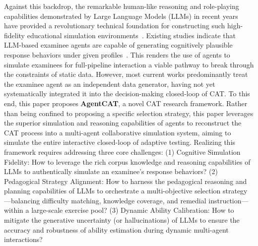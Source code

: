 Against this backdrop, the remarkable human-like reasoning and role-playing capabilities demonstrated by Large Language Models (LLMs) in recent years have provided a revolutionary technical foundation for constructing such high-fidelity educational simulation environments~\cite{11410595,naveed2025comprehensive,lang10669809}. Existing studies indicate that LLM-based examinee agents are capable of generating cognitively plausible response behaviors under given profiles~\cite{gao2025agent4edu}. This renders the use of agents to simulate examinees for full-pipeline interaction a viable pathway to break through the constraints of static data. However, most current works predominantly treat the examinee agent as an independent data generator, having not yet systematically integrated it into the decision-making closed-loop of CAT. To this end, this paper proposes \textbf{AgentCAT}, a novel CAT research framework. Rather than being confined to proposing a specific selection strategy, this paper leverages the superior simulation and reasoning capabilities of agents to reconstruct the CAT process into a multi-agent collaborative simulation system, aiming to simulate the entire interactive closed-loop of adaptive testing. Realizing this framework requires addressing three core challenges: (1) Cognitive Simulation Fidelity: How to leverage the rich corpus knowledge and reasoning capabilities of LLMs to authentically simulate an examinee's response behaviors?
(2) Pedagogical Strategy Alignment: How to harness the pedagogical reasoning and planning capabilities of LLMs to orchestrate a multi-objective selection strategy—balancing difficulty matching, knowledge coverage, and remedial instruction—within a large-scale exercise pool?
(3) Dynamic Ability Calibration: How to mitigate the generative uncertainty (or hallucinations) of LLMs to ensure the accuracy and robustness of ability estimation during dynamic multi-agent interactions?

